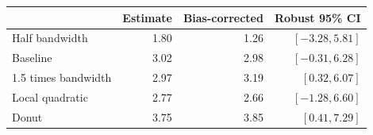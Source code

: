 \begin{center}
\small\renewcommand{\arraystretch}{1.3}
\begin{tabular}{@{}lrrr@{}}\toprule
 & Estimate & Bias-corrected & Robust 95\% CI\\\midrule
Half bandwidth & 1.80 & 1.26 & $[-3.28, 5.81]$\\
Baseline & 3.02 & 2.98 & $[-0.31, 6.28]$\\
1.5 times bandwidth & 2.97 & 3.19 & $[0.32, 6.07]$\\
Local quadratic & 2.77 & 2.66 & $[-1.28, 6.60]$\\
Donut & 3.75 & 3.85 & $[0.41, 7.29]$\\
\bottomrule\end{tabular}
\end{center}
